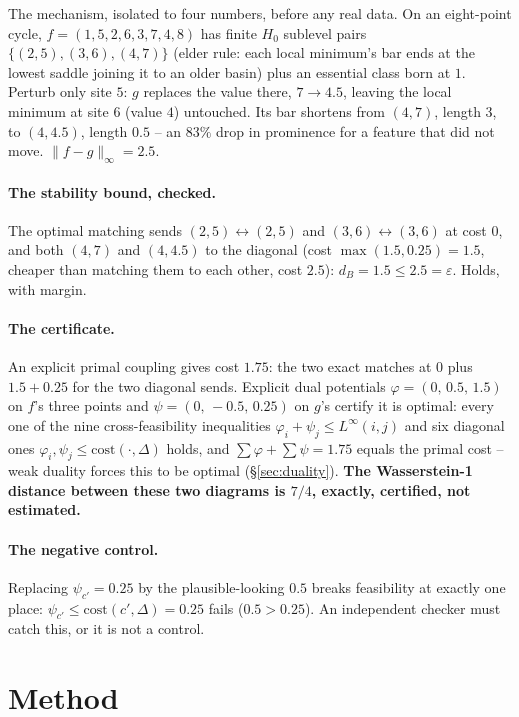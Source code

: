 \documentclass[11pt,a4paper]{article}
\newcommand{\dB}{d_{B}}
\begin{document}
The mechanism, isolated to four numbers, before any real data. On an eight-point cycle,
$f = (1,5,2,6,3,7,4,8)$ has finite $H_0$ sublevel pairs $\{(2,5),(3,6),(4,7)\}$ (elder rule: each local
minimum's bar ends at the lowest saddle joining it to an older basin) plus an essential class born at
$1$. Perturb only site $5$: $g$ replaces the value there, $7\to4.5$, leaving the local minimum at
site $6$ (value $4$) untouched. Its bar shortens from $(4,7)$, length $3$, to $(4,4.5)$, length $0.5$ --
an $83\%$ drop in prominence for a feature that did not move. $\|f-g\|_\infty = 2.5$.

\paragraph{The stability bound, checked.} The optimal matching sends $(2,5)\!\leftrightarrow\!(2,5)$ and
$(3,6)\!\leftrightarrow\!(3,6)$ at cost $0$, and both $(4,7)$ and $(4,4.5)$ to the diagonal (cost
$\max(1.5,0.25)=1.5$, cheaper than matching them to each other, cost $2.5$): $\dB=1.5\le2.5=\varepsilon$.
Holds, with margin.

\paragraph{The certificate.} An explicit primal coupling gives cost $1.75$: the two exact matches at $0$
plus $1.5+0.25$ for the two diagonal sends. Explicit dual potentials $\varphi=(0,\,0.5,\,1.5)$ on
$f$'s three points and $\psi=(0,\,-0.5,\,0.25)$ on $g$'s certify it is optimal: every one of the nine
cross-feasibility inequalities $\varphi_i+\psi_j\le L^\infty(i,j)$ and six diagonal ones
$\varphi_i,\psi_j\le\mathrm{cost}(\cdot,\Delta)$ holds, and $\sum\varphi+\sum\psi=1.75$ equals the primal
cost -- weak duality forces this to be optimal (\S\ref{sec:duality}). \textbf{The Wasserstein-1 distance
between these two diagrams is $7/4$, exactly, certified, not estimated.}

\paragraph{The negative control.} Replacing $\psi_{c'}=0.25$ by the plausible-looking $0.5$ breaks
feasibility at exactly one place: $\psi_{c'}\le\mathrm{cost}(c',\Delta)=0.25$ fails ($0.5>0.25$). An
independent checker must catch this, or it is not a control.

\section{Method}
\label{sec:method}
\end{document}
